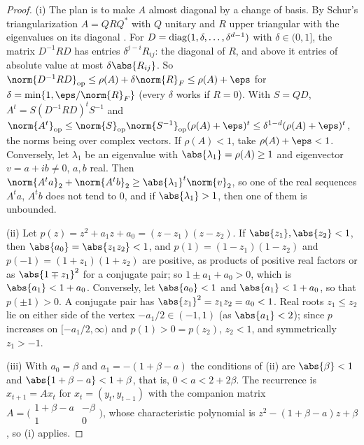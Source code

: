 \begin{refsection}
\begin{proof}
(i) The plan is to make $A$ almost diagonal by a change of basis. By Schur's triangularization $A=QRQ^*$ with $Q$ unitary and $R$ upper triangular with the eigenvalues on its diagonal \parencite{HornJohnson2013}. For $D=\operatorname{diag}(1,\delta,\dots,\delta^{d-1})$ with $\delta\in(0,1]$, the matrix $D^{-1}RD$ has entries $\delta^{j-i}R_{ij}$: the diagonal of $R$, and above it entries of absolute value at most $\delta\abs{R_{ij}}$. So $\norm{D^{-1}RD}_{\op}\le\rho(A)+\delta\norm{R}_F\le\rho(A)+\eps$ for $\delta=\min\{1,\eps/\norm{R}_F\}$ (every $\delta$ works if $R=0$). With $S=QD$, $A^t=S(D^{-1}RD)^tS^{-1}$ and $\norm{A^t}_{\op}\le\norm{S}_{\op}\norm{S^{-1}}_{\op}(\rho(A)+\eps)^t\le\delta^{1-d}(\rho(A)+\eps)^t$, the norms being over complex vectors. If $\rho(A)<1$, take $\rho(A)+\eps<1$. Conversely, let $\lambda_1$ be an eigenvalue with $\abs{\lambda_1}=\rho(A)\ge1$ and eigenvector $v=a+ib\ne0$, $a,b$ real. Then $\norm{A^ta}_2+\norm{A^tb}_2\ge\abs{\lambda_1}^t\norm{v}_2$, so one of the real sequences $A^ta$, $A^tb$ does not tend to $0$, and if $\abs{\lambda_1}>1$, then one of them is unbounded.

(ii) Let $p(z)=z^2+a_1z+a_0=(z-z_1)(z-z_2)$. If $\abs{z_1},\abs{z_2}<1$, then $\abs{a_0}=\abs{z_1z_2}<1$, and $p(1)=(1-z_1)(1-z_2)$ and $p(-1)=(1+z_1)(1+z_2)$ are positive, as products of positive real factors or as $\abs{1\mp z_1}^2$ for a conjugate pair; so $1\pm a_1+a_0>0$, which is $\abs{a_1}<1+a_0$. Conversely, let $\abs{a_0}<1$ and $\abs{a_1}<1+a_0$, so that $p(\pm1)>0$. A conjugate pair has $\abs{z_1}^2=z_1z_2=a_0<1$. Real roots $z_1\le z_2$ lie on either side of the vertex $-a_1/2\in(-1,1)$ (as $\abs{a_1}<2$); since $p$ increases on $[-a_1/2,\infty)$ and $p(1)>0=p(z_2)$, $z_2<1$, and symmetrically $z_1>-1$.

(iii) With $a_0=\beta$ and $a_1=-(1+\beta-a)$ the conditions of (ii) are $\abs{\beta}<1$ and $\abs{1+\beta-a}<1+\beta$, that is, $0<a<2+2\beta$. The recurrence is $x_{t+1}=Ax_t$ for $x_t=(y_t,y_{t-1})$ with the companion matrix $A=\bigl(\begin{smallmatrix}1+\beta-a&-\beta\\1&0\end{smallmatrix}\bigr)$, whose characteristic polynomial is $z^2-(1+\beta-a)z+\beta$, so (i) applies.
\end{proof}


\end{refsection}
